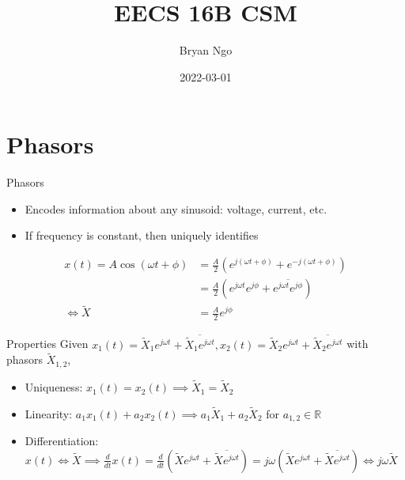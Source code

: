 \documentclass[aspectratio=169]{beamer}
\title{EECS 16B CSM}
\author{Bryan Ngo}
\date{2022-03-01}
\institute{UC Berkeley}
\begin{document}
\begin{frame}
    \maketitle
\end{frame}

\maketitle

\section{Phasors}

\begin{frame}{Phasors}
    \begin{itemize}
        \item Encodes information about any sinusoid: voltage, current, etc.
        \item If frequency is constant, then uniquely identifies
    \end{itemize}
    \begin{align}
        x(t) = A \cos(\omega t + \phi) &= \frac{A}{2} \left(e^{j (\omega t + \phi)} + e^{-j (\omega t + \phi)}\right) \\
        &= \frac{A}{2} \left(e^{j \omega t} e^{j \phi} + \overline{e^{j \omega t} e^{j \phi}}\right) \\
        \iff \widetilde{X} &= \frac{A}{2} e^{j \phi}
    \end{align}
\end{frame}

\begin{frame}{Properties}
    Given \(x_1(t) = \widetilde{X}_1 e^{j \omega t} + \overline{\widetilde{X}_1 e^{j \omega t}}, x_2(t) = \widetilde{X}_2 e^{j \omega t} + \overline{\widetilde{X}_2 e^{j \omega t}}\) with phasors \(\widetilde{X}_{1, 2}\),
    \begin{itemize}
        \item Uniqueness: \(x_1(t) = x_2(t) \implies \widetilde{X}_1 = \widetilde{X}_2\)
        \item Linearity: \(a_1 x_1(t) + a_2 x_2(t) \implies a_1 \widetilde{X}_1 + a_2 \widetilde{X}_2\) for \(a_{1, 2} \in \mathbb{R}\)
        \item Differentiation: \(x(t) \iff \widetilde{X} \implies \frac{d}{dt} x(t) = \frac{d}{dt} \left(\widetilde{X} e^{j \omega t} + \overline{\widetilde{X} e^{j \omega t}}\right) = j \omega \left(\widetilde{X} e^{j \omega t} + \overline{\widetilde{X} e^{j \omega t}}\right) \iff j \omega \widetilde{X}\)
    \end{itemize}
\end{frame}
\end{document}
